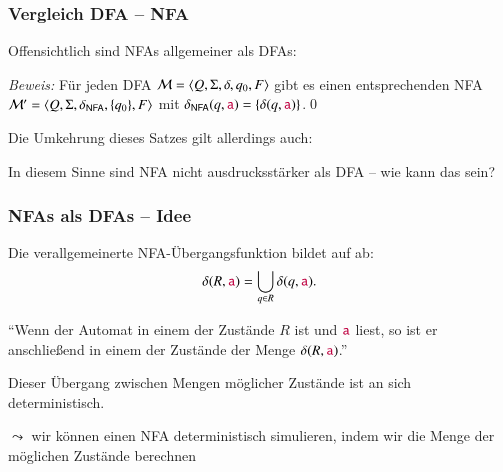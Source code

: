 \documentclass[onlymath]{beamer}
\begin{document}
% 



\begin{frame}\frametitle{Vergleich DFA -- NFA}

Offensichtlich sind NFAs allgemeiner als DFAs:


\emph{Beweis:} Für jeden DFA  $\mathcal{M}=\langle{Q,\Sigma,\delta,q_0,F}\rangle$ gibt es
einen entsprechenden NFA $\mathcal{M}'=\langle{Q,\Sigma,\delta_{\textsf{NFA}},\{q_0\},F}\rangle$
mit $\delta_{\textsf{NFA}}(q,\mathtt{\textcolor{purple}{a}}) = \{\delta(q,\mathtt{\textcolor{purple}{a}})\}$.\qed
\bigskip
\pause

Die Umkehrung dieses Satzes gilt allerdings auch:

In diesem Sinne sind NFA nicht ausdrucksstärker als DFA -- wie kann das sein?

\end{frame}

\begin{frame}\frametitle{NFAs als DFAs -- Idee}

Die verallgemeinerte NFA-Übergangsfunktion bildet  auf
 ab:
\[\delta(R,\mathtt{\textcolor{purple}{a}})=\bigcup_{q\in R}\delta(q,\mathtt{\textcolor{purple}{a}}).\]

\alert{"`Wenn der Automat in einem der Zustände $R$ ist und $\mathtt{\textcolor{purple}{a}}$ liest, so ist er anschließend in einem der Zustände der Menge $\delta(R,\mathtt{\textcolor{purple}{a}})$."'}
\medskip

Dieser Übergang zwischen Mengen möglicher Zustände ist an sich deterministisch.
\bigskip

$\leadsto$ wir können einen NFA deterministisch simulieren, indem wir die Menge der möglichen Zustände berechnen

\end{frame}
\end{document}
